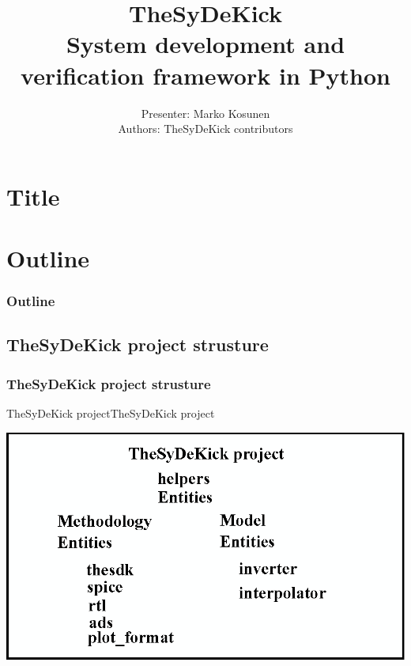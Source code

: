 \documentclass{sdkslides}
\title{\Huge{TheSyDeKick}\\ \vspace{0.2in} \normalsize{System development and
verification framework in Python}}
\author{Presenter: Marko Kosunen \\Authors: TheSyDeKick contributors}
\date{\lectdate}
\newcommand{\sectname}{Section Name}
\begin{document}
\section*{Title}
\sdktitleframe

\section*{Outline}
\begin{frame}[c]
    \frametitle{Outline}
    \tableofcontents
\end{frame}




\renewcommand{\sectname}{TheSyDeKick project strusture}
\subsection*{\sectname}
\begin{frame}[t]
    \frametitle{\sectname}
    \begin{block}{TheSyDeKick project{TheSyDeKick project}}
        \begin{center}
            \includegraphics[width=\textwidth]{Pics/TheSyDeKick-entity-principles.eps}
        \end{center}
    \end{block}
\end{frame}
\end{document}
